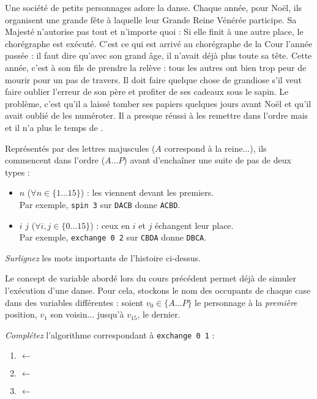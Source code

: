 Une société de petits personnages adore la danse. Chaque année, pour Noël, ils
organisent une grande fête à laquelle leur Grande Reine Vénérée participe. Sa
Majesté n'autorise pas tout et n'importe quoi : 
Si elle finit à une autre place, le
chorégraphe est exécuté. C'est ce qui est arrivé au chorégraphe de la Cour
l'année passée : il faut dire qu'avec son grand âge, il n'avait déjà plus toute
sa tête. Cette année, c'est à son fils de prendre la relève : tous les autres
ont bien trop peur de mourir pour un pas de travers. Il doit faire quelque
chose de grandiose s'il veut faire oublier l'erreur de son père et profiter de
ses cadeaux sous le sapin.
Le problème, c'est qu'il a laissé tomber ses papiers quelques
jours avant Noël et qu'il avait oublié de les numéroter.
Il a presque réussi à les remettre dans l'ordre mais  et il n'a plus le temps de .

Représentés par des lettres majuscules ($A$ correspond à la reine...),
ils commencent dans l'ordre (${A\dots P}$) avant d'enchaîner une suite de pas
de deux types :
\begin{itemize}
\item {} $n$ ($\forall n \in \{1\dots15\}$) :
	les  viennent devant les premiers. \\
	Par exemple, \texttt{spin 3} sur \texttt{DACB} donne \texttt{ACBD}.
\item {} $i$ $j$ ($\forall i,j \in \{0\dots15\}$) :
	ceux en $i$ et $j$ échangent leur place. \\
	Par exemple, \texttt{exchange 0 2} sur \texttt{CBDA} donne \texttt{DBCA}.
\end{itemize}

\begin{exo}
\emph{Surlignez} les mots importants de l'histoire ci-dessus.
\end{exo}

Le concept de variable abordé lors du cours précédent permet déjà de simuler
l'exécution d'une danse. Pour cela, stockons le nom des occupants de chaque
case dans des variables différentes : soient $v_0\in\{A\dots P\}$ le personnage
à la \emph{première} position, $v_1$ son voisin...
jusqu'à $v_{15}$, le dernier.

\begin{exo}
\emph{Complétez} l'algorithme correspondant à \texttt{exchange 0 1} :
\begin{enumerate}
\item {} $\leftarrow$ 
\item {} $\leftarrow$ 
\item {} $\leftarrow$ 
\end{enumerate}
\end{exo}

